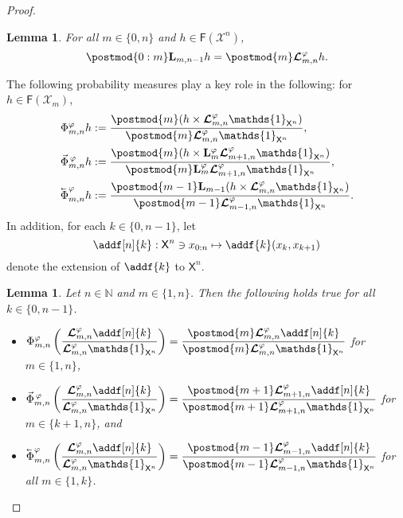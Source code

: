 \documentclass{article}
\newtheorem{lemma}[theorem]{Lemma}
\newcommand{\Xfd}{\mathcal{X}}
\newcommand{\cev}[1]{\reflectbox{\ensuremath{\vec{\reflectbox{\ensuremath{#1}}}}}}
\newcommand{\ukmod}[1]{\mathbf{L}_{#1}^\precpar}
\newcommand{\shiftbwd}{\cev{\shiftsymbol}^{\precpar}}
\newcommand{\shiftfwd}{\vec{\shiftsymbol}^{\, \precpar}}
\newcommand{\shiftsymbol}{\Phi}
\newcommand{\precpar}{\varphi}
\newcommand{\intvect}[2]{\{ #1, #2 \}}
\newcommand{\noshift}{\shiftsymbol^{\precpar}}
\newcommand{\nset}{\mathbb{N}}
\newcommand{\1}{\mathbbm{1}}
\newcommand{\retrokmod}{\boldsymbol{\mathcal{L}}^\precpar}
\newcommand{\uk}[1]{\mathbf{L}_{#1}}
\newcommand{\Xset}{\mathsf{X}}
\newcommand{\bmf}[1]{\set{F}(#1)}
\newcommand{\set}[1]{\mathsf{#1}}
\def\1{\mathds{1}}
\newcommand{\eqdef}{\ensuremath{:=}}
\begin{document}
\begin{proof}
\begin{lemma} \label{lem:retro:prospective:id}
For all $m \in \intvect{0}{n}$ and $h \in \bmf{\Xfd^n}$, 
\begin{equation} \label{eq:retro:prospective:id}
\postmod{0:m} \uk{m, n - 1} h = \postmod{m} \retrokmod_{m, n} h.  
\end{equation}
\end{lemma}
The following probability measures play a key role in the following: for $h \in \bmf{\Xfd_m}$, 
\begin{align}
\noshift_{m, n} h &\eqdef \frac{\postmod{m} (h \times \retrokmod_{m, n} \1_{\Xset^n})}{\postmod{m} \retrokmod_{m, n} \1_{\Xset^n}}, \nonumber \\
\shiftfwd_{m, n} h &\eqdef \frac{\postmod{m} (h \times \ukmod{m} \retrokmod_{m + 1, n} \1_{\Xset^n})}{\postmod{m} \ukmod{m} \retrokmod_{m + 1, n} \1_{\Xset^n}}, \nonumber \\
\shiftbwd_{m, n} h &\eqdef \frac{\postmod{m - 1} \uk{m - 1}(h \times \retrokmod_{m, n} \1_{\Xset^n})}{\postmod{m - 1} \retrokmod_{m - 1, n} \1_{\Xset^n}}.  \nonumber 
\end{align}
In addition, for each $k \in \intvect{0}{n - 1}$, let 
\begin{equation} \label{eq:def:addf}
\addf[n]{k} : \Xset^n \ni x_{0:n} \mapsto \addf{k}(x_k, x_{k + 1})  
\end{equation}
denote the extension of $\addf{k}$ to $\Xset^n$. 

\begin{lemma} \label{lemma:three:identities}
Let $n \in \nset$ and $m \in \intvect{1}{n}$. Then the following holds true for all $k \in \intvect{0}{n - 1}$. 
\begin{itemize}
\item[(i)]  
$
\displaystyle \noshift_{m, n} \left( \frac{\retrokmod_{m, n} \addf[n]{k}}{\retrokmod_{m, n} \1_{\Xset^n}} \right) = \frac{\postmod{m} \retrokmod_{m, n} \addf[n]{k}}{\postmod{m} \retrokmod_{m, n} \1_{\Xset^n}}$ \quad for $m \in \intvect{1}{n}$, 
\item[(ii)]  
$
\displaystyle \shiftfwd_{m, n} \left( \frac{\retrokmod_{m, n} \addf[n]{k}}{\retrokmod_{m, n} \1_{\Xset^n}} \right) = \frac{\postmod{m + 1} \retrokmod_{m + 1, n} \addf[n]{k}}{\postmod{m + 1} \retrokmod_{m + 1, n} \1_{\Xset^n}}
$ \quad for $m \in \intvect{k + 1}{n}$, and 
\item[(iii)] 
$
\displaystyle \shiftbwd_{m, n} \left( \frac{\retrokmod_{m, n} \addf[n]{k}}{\retrokmod_{m, n} \1_{\Xset^n}} \right) = \frac{\postmod{m - 1} \retrokmod_{m - 1, n} \addf[n]{k}}{\postmod{m - 1} \retrokmod_{m - 1, n} \1_{\Xset^n}}
$ \quad for all $m \in \intvect{1}{k}$. 
\end{itemize}
\end{lemma}


\end{proof}
\end{document}
